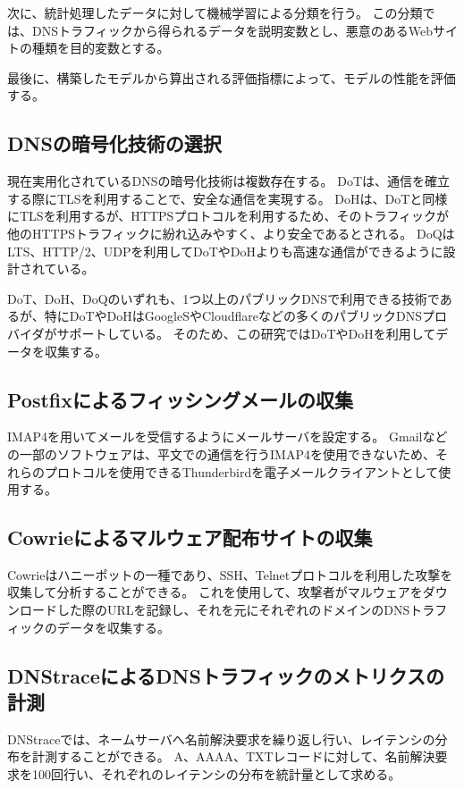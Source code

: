 \documentclass[twocolumn,article]{jlreq}
\begin{document}
次に、統計処理したデータに対して機械学習による分類を行う。
この分類では、DNSトラフィックから得られるデータを説明変数とし、悪意のあるWebサイトの種類を目的変数とする。

最後に、構築したモデルから算出される評価指標によって、モデルの性能を評価する。

\subsection{DNSの暗号化技術の選択}
現在実用化されているDNSの暗号化技術は複数存在する。
DoTは、通信を確立する際にTLSを利用することで、安全な通信を実現する。
DoHは、DoTと同様にTLSを利用するが、HTTPSプロトコルを利用するため、そのトラフィックが他のHTTPSトラフィックに紛れ込みやすく、より安全であるとされる。
DoQはLTS、HTTP/2、UDPを利用してDoTやDoHよりも高速な通信ができるように設計されている。

DoT、DoH、DoQのいずれも、1つ以上のパブリックDNSで利用できる技術であるが、特にDoTやDoHはGoogleSやCloudflareなどの多くのパブリックDNSプロバイダがサポートしている。
そのため、この研究ではDoTやDoHを利用してデータを収集する。

\subsection{Postfixによるフィッシングメールの収集}
IMAP4を用いてメールを受信するようにメールサーバを設定する。
Gmail\theendnotes[3]{}などの一部のソフトウェアは、平文での通信を行うIMAP4を使用できないため、それらのプロトコルを使用できるThunderbird\theendnotes[4]{}を電子メールクライアントとして使用する。

\subsection{Cowrieによるマルウェア配布サイトの収集}
Cowrie\theendnotes[5]{}はハニーポットの一種であり、SSH、Telnetプロトコルを利用した攻撃を収集して分析することができる。
これを使用して、攻撃者がマルウェアをダウンロードした際のURLを記録し、それを元にそれぞれのドメインのDNSトラフィックのデータを収集する。

\subsection{DNStraceによるDNSトラフィックのメトリクスの計測}
DNStraceでは、ネームサーバへ名前解決要求を繰り返し行い、レイテンシの分布を計測することができる。
A、AAAA、TXTレコードに対して、名前解決要求を100回行い、それぞれのレイテンシの分布を統計量として求める。
\end{document}
